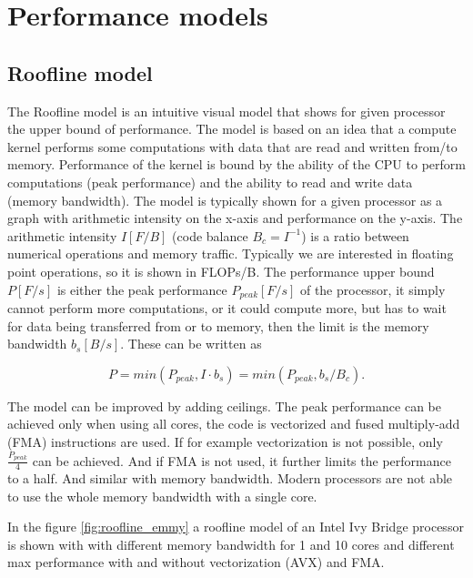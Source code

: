 {%
\chapter{Performance models}

\section{Roofline model}

The Roofline model is an intuitive visual model that shows for given processor the upper bound of performance. The model is based on an idea that a compute kernel performs some computations with data that are read and written from/to memory. Performance of the kernel is bound by the ability of the CPU to perform computations (peak performance) and the ability to read and write data (memory bandwidth).
The model is typically shown for a given processor as a graph with arithmetic intensity on the x-axis and performance on the y-axis. The arithmetic intensity $I [F/B]$ (code balance $B_c = I^{-1}$) is a ratio between numerical operations and memory traffic. Typically we are interested in floating point operations, so it is shown in FLOPs/B.
The performance upper bound $P [F/s]$ is either the peak performance $P_{peak} [F/s]$ of the processor, it simply cannot perform more computations, or it could compute more, but has to wait for data being transferred from or to memory, then the limit is the memory bandwidth $b_s [B/s]$.
These can be written as

\begin{equation}
   P = min(P_{peak}, I \cdot b_s) = min(P_{peak}, b_s / B_c).
\end{equation}

The model can be improved by adding ceilings. The peak performance can be achieved only when using all cores, the code is vectorized and fused multiply-add (FMA) instructions are used. If for example vectorization is not possible, only $\frac{P_{peak}}{4}$ can be achieved. And if FMA is not used, it further limits the performance to a half.
And similar with memory bandwidth. Modern processors are not able to use the whole memory bandwidth with a single core.  

In the figure \ref{fig:roofline_emmy} a roofline model of an Intel Ivy Bridge processor is shown with with different memory bandwidth for 1 and 10 cores and different max performance with and without vectorization (AVX) and FMA. 

}
